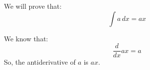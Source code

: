 We will prove that:
\[\int a \, dx = ax\]

We know that:
\[\frac{d}{dx} ax = a\]
So, the antiderivative of \(a\) is \(ax\).
